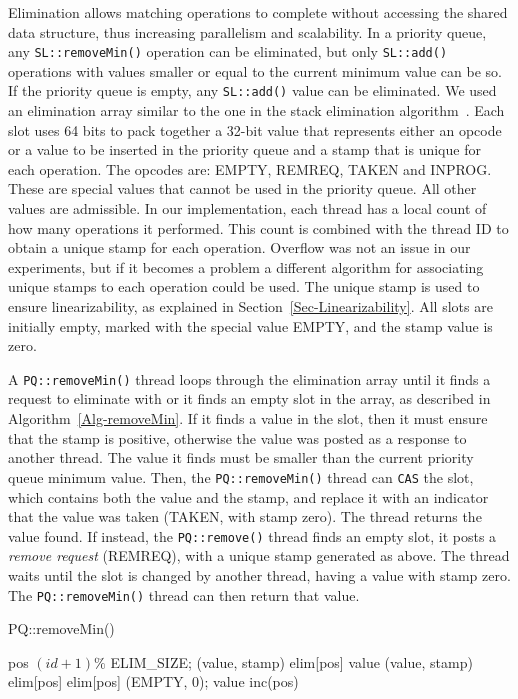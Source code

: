 Elimination allows matching operations to complete without accessing the shared data structure, thus increasing parallelism and scalability. In a priority queue, any \texttt{SL::removeMin()} operation can be eliminated, but only \texttt{SL::add()} operations with values smaller or equal to the current minimum value can be so. If the priority queue is empty, any \texttt{SL::add()} value can be eliminated. 
We used an elimination array similar to the one in the stack elimination algorithm~\cite{Hendler2010a}. Each slot uses 64 bits to pack together a 32-bit value that represents either an opcode or a value to be inserted in the priority queue and a stamp that is unique for each operation. The opcodes are: EMPTY, REMREQ, TAKEN and INPROG. These are special values that cannot be used in the priority queue. All other values are admissible. In our implementation, each thread has a local count of how many operations it performed. This count is combined with the thread ID to obtain a unique stamp for each operation. Overflow was not an issue in our experiments, but if it becomes a problem a different algorithm for associating unique stamps to each operation could be used. The unique stamp is used to ensure linearizability, as explained in Section~\ref{Sec-Linearizability}. All slots are initially empty, marked with the special value EMPTY, and the stamp value is zero. 
  
A \texttt{PQ::removeMin()} thread loops through the elimination array until it finds a request to eliminate with or it finds an empty slot in the array, as described in Algorithm~\ref{Alg-removeMin}.
If it finds a value in the slot, then it must ensure that the stamp is positive, otherwise the value was posted as a response to another thread. The value it finds must be smaller than the current priority queue minimum value. Then, the \texttt{PQ::removeMin()} thread can \texttt{CAS} the slot, which contains both the value and the stamp, and replace it with an indicator that the value was taken (TAKEN, with stamp zero). The thread returns the value found. If instead, the \texttt{PQ::remove()} thread finds an empty slot, it posts a \emph{remove request} (REMREQ), with a unique stamp generated as above. The thread waits until the slot is changed by another thread, having a value with stamp zero. The \texttt{PQ::removeMin()} thread can then return that value. 

\begin{algorithm}[htb]
\caption{PQ::removeMin()}
\label{Alg-removeMin}
\begin{algorithmic}[1]
	\State pos \attr $(id + 1) \% $ ELIM\_SIZE; (value, stamp) \attr elim[pos]
		\State \Return value
	    \EndIf
	\EndIf
		\Repeat
		  \State (value, stamp) \attr elim[pos]
		\State elim[pos] \attr (EMPTY, 0); \Return value
	    \EndIf    
	\EndIf
	\State inc(pos)
\EndWhile
\end{algorithmic}
\end{algorithm}

